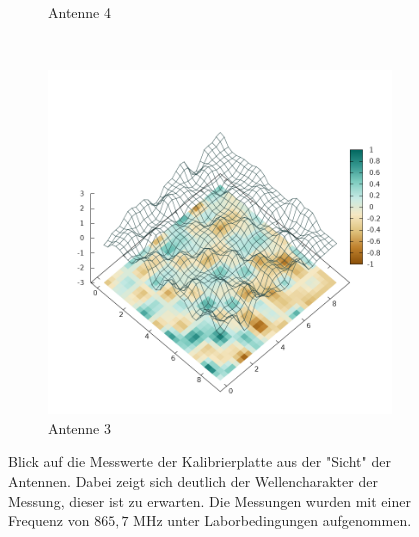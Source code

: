 \begin{figure}[ht!]
\begin{subfigure}[b]{0.4\textwidth}
			\caption[Loren ipsum]{Antenne 4}
			\label{fig:Plate0_A3}
        \end{subfigure}
\\
        \begin{subfigure}[b]{0.4\textwidth}
			\centering
			\includegraphics[width=\textwidth]{img/Plate0_A3.png}
			\caption[Loren ipsum]{Antenne 3}
			\label{fig:Plate0_A4}
        \end{subfigure}
        \caption[Reale Messwerte visualisiert]{Blick auf die Messwerte der  Kalibrierplatte aus der "Sicht" der Antennen. Dabei zeigt sich deutlich der Wellencharakter der Messung, dieser ist zu erwarten. Die Messungen wurden mit einer Frequenz von $865,7$ MHz unter Laborbedingungen aufgenommen. }\label{fig:Real_Measurements}
\end{figure}
%
